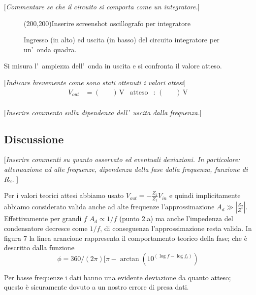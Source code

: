 \documentclass[10pt,a4paper]{article}
\newcommand{\rem}[1]{[\emph{#1}]}
\newcommand{\exn}{\phantom{xxx}}
\begin{document}
	\rem{Commentare se che il circuito si comporta come un integratore.}
	\begin{figure}[htb]
		\begin{center}
			\framebox(200,200){Inserire screenshot oscillografo per integratore}
		\end{center}
		\caption{\small Ingresso (in alto) ed uscita (in basso) del circuito integratore per un'~onda quadra.}
		\label{fig:oscinte}
	\end{figure}
	
	Si misura l'~ampiezza dell'~onda  in uscita e si confronta il valore atteso.
	
	\rem{Indicare brevemente come sono stati ottenuti i valori attesi}
	\begin{align*}
	V_{out} &= (\exn )\,\mathrm{V} & \mathrm{atteso} &:\,(\exn  )\, \mathrm{V}  \\
	\end{align*}
	
	\rem{Inserire commento sulla dipendenza dell'~uscita dalla frequenza.}
	
	\subsection{Discussione}
	
	\rem{Inserire commenti su quanto osservato ed eventuali deviazioni. 
		In particolare: attenuazione ad alte frequenze, dipendenza della fase dalla frequenza, funzione di $R_2$. }

 Per i valori teorici attesi abbiamo usato $V_{out}= -\frac{Z_2}{Z_1} V_{in}$ e quindi implicitamente abbiamo considerato valida anche ad alte  frequenze l'approssimazione $A_d \gg |\frac{Z_2}{Z_1}|$. Effettivamente per grandi $f$  $A_d\propto 1/f$ (punto 2.a) ma anche l'impedenza del condensatore decresce come $1/f$, di conseguenza l'approssimazione resta valida.
	In figura 7  la linea arancione rappresenta il comportamento teorico della fase; che è descritto dalla funzione \[ \phi = 360/(2\pi)[\pi - \arctan(10^{(\log f -\log f_t)})\] 

Per basse frequenze i dati hanno una evidente deviazione da quanto atteso; questo è sicuramente dovuto a un nostro errore di presa dati.

	\begin{tabular}{cc}

\end{tabular}
\end{document}
